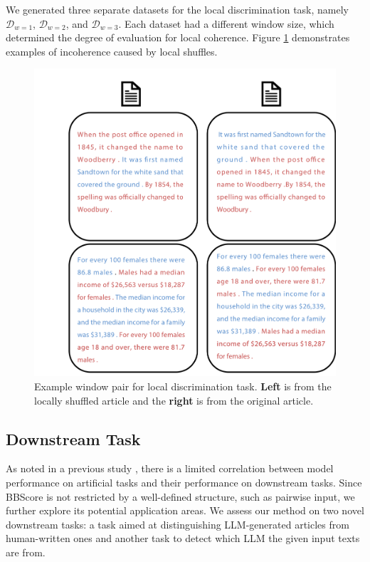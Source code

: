 \documentclass[letterpaper]{article}
\begin{document}
We generated three separate datasets for the local discrimination task, namely $\mathcal{D}_{w=1}$, $\mathcal{D}_{w=2}$, and $\mathcal{D}_{w=3}$. Each dataset had a different window size, which determined the degree of evaluation for local coherence. Figure \ref{Figure:local_exp} demonstrates examples of incoherence caused by local shuffles.



\begin{figure}[t!]
  \centering
  \includegraphics[width=\linewidth,trim={2.9cm 0 0 3.5cm},clip]{pictures/documents.pdf}
  \caption{Example window pair for local discrimination task. \textbf{Left} is from the locally shuffled article and the \textbf{right} is from the original article.}
  \label{Figure:local_exp}
\end{figure}



\subsection{Downstream Task}\label{exp:down}
As noted in a previous study \citep{mohiuddin-etal-2021-rethinking}, there is a limited correlation between model performance on artificial tasks and their performance on downstream tasks. Since BBScore is not restricted by a well-defined structure, such as pairwise input, we further explore its potential application areas. We assess our method on two novel downstream tasks: a task aimed at distinguishing LLM-generated articles from human-written ones and another task to detect which LLM the given input texts are from.
\end{document}
